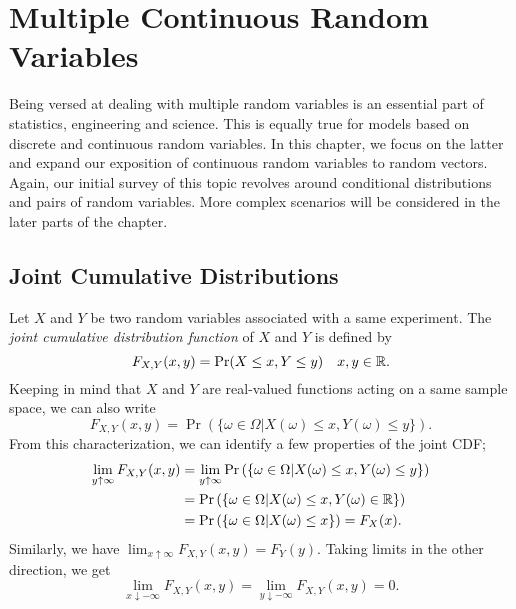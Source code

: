 \chapter{Multiple Continuous Random Variables}

Being versed at dealing with multiple random variables is an essential part of statistics, engineering and science.
This is equally true for models based on discrete and continuous random variables.
In this chapter, we focus on the latter and expand our exposition of continuous random variables to random vectors.
Again, our initial survey of this topic revolves around conditional distributions and pairs of random variables.
More complex scenarios will be considered in the later parts of the chapter.


\section{Joint Cumulative Distributions}

Let $X$ and $Y$ be two random variables associated with a same experiment.
The \emph{joint cumulative distribution function} of $X$ and $Y$ is defined by 
\begin{equation*}
F_{X,Y} (x, y) = \Pr (X \leq x, Y \leq y) \quad x, y \in \mathbb{R} .
\end{equation*}
Keeping in mind that $X$ and $Y$ are real-valued functions acting on a same sample space, we can also write
\begin{equation*}
F_{X,Y} (x, y) = \Pr \left( \{ \omega \in \Omega | X(\omega) \leq x, Y(\omega) \leq y \} \right) .
\end{equation*}
From this characterization, we can identify a few properties of the joint CDF;
\begin{equation*}
\begin{split}
\lim_{y \uparrow \infty} F_{X,Y} (x, y)
&= \lim_{y \uparrow \infty} \Pr \left( \{ \omega \in \Omega | X(\omega) \leq x, Y(\omega) \leq y \} \right) \\
&= \Pr \left( \{ \omega \in \Omega | X(\omega) \leq x, Y(\omega) \in \mathbb{R} \} \right) \\
&= \Pr \left( \{ \omega \in \Omega | X(\omega) \leq x \} \right)
= F_X (x) .
\end{split}
\end{equation*}
Similarly, we have $\lim_{x \uparrow \infty} F_{X,Y} (x,y) = F_Y (y)$.
Taking limits in the other direction, we get
\begin{equation*}
\lim_{x \downarrow -\infty} F_{X,Y} (x,y) 
= \lim_{y \downarrow -\infty} F_{X,Y} (x,y) = 0 .
\end{equation*}

